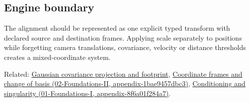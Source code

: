 \subsection{Engine boundary}\label{appendix-5f40b4fea463-engine-boundary}

The alignment should be represented as one explicit typed transform with declared source and destination frames. Applying scale separately to positions while forgetting camera translations, covariance, velocity or distance thresholds creates a mixed-coordinate system.

Related: \hyperref[appendix-24269cb6977c]{Gaussian covariance projection and footprint}, \href{../02-Foundations-II/main.pdf\#nameddest=appendix-1bae9457dbc3}{Coordinate frames and change of basis (02-Foundations-II, appendix-1bae9457dbc3)}, \href{../01-Foundations-I/main.pdf\#nameddest=appendix-8f6a01f284a7}{Conditioning and singularity (01-Foundations-I, appendix-8f6a01f284a7)}.
